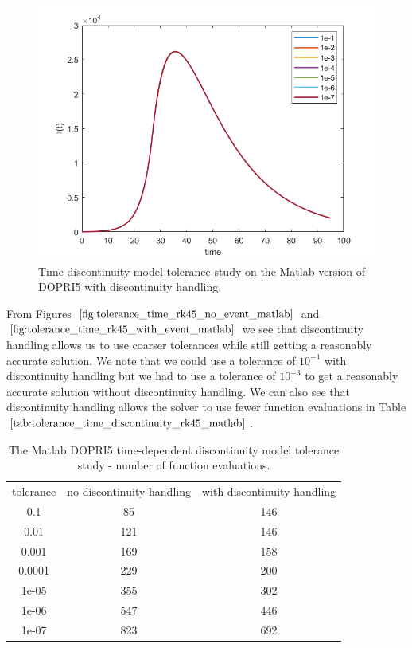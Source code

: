 \begin{figure}[H]
\centering
\includegraphics[width=0.7\linewidth]{./figures/tolerance_time_rk45_with_event_matlab}
\caption{Time discontinuity model tolerance study on the Matlab version of DOPRI5 with discontinuity handling.}
\label{fig:tolerance_time_rk45_with_event_matlab}
\end{figure}

From Figures $\ref{fig:tolerance_time_rk45_no_event_matlab}$ and $\ref{fig:tolerance_time_rk45_with_event_matlab}$ we see that discontinuity handling allows us to use coarser tolerances while still getting a reasonably accurate solution. We note that we could use a tolerance of $10^{-1}$ with discontinuity handling but we had to use a tolerance of $10^{-3}$ to get a reasonably accurate solution without discontinuity handling. We can also see that discontinuity handling allows the solver to use fewer function evaluations in Table $\ref{tab:tolerance_time_discontinuity_rk45_matlab}$.

\begin{table}[H]
\caption {The Matlab DOPRI5 time-dependent discontinuity model tolerance study - number of function evaluations.} 
\label{tab:tolerance_time_discontinuity_rk45_matlab} 
\begin{center}
\begin{tabular}{ c c c }
tolerance & no discontinuity handling & with discontinuity handling\\ 
0.1 & 85 & 146 \\
0.01 & 121 & 146 \\
0.001 & 169 & 158 \\
0.0001 & 229 & 200 \\
1e-05 & 355 & 302 \\
1e-06 & 547 & 446 \\
1e-07 & 823 & 692 \\
\end{tabular}
\end{center}
\end{table}

